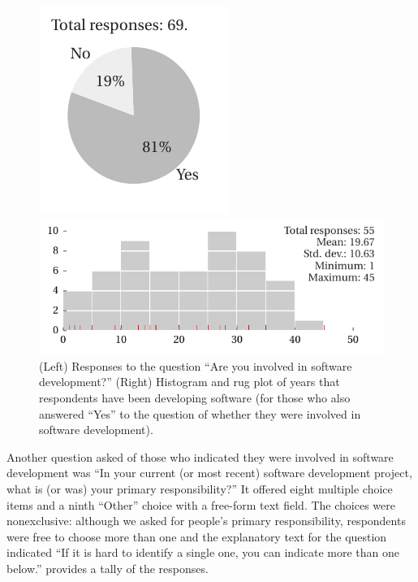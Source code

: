 \documentclass{casicswhitepaper}
\begin{document}
\begin{figure}[thb]
  \vspace*{1ex}
  \hspace*{0.25in}
  \begin{minipage}[b]{0.3\linewidth}
    \includegraphics{files/plots/number-of-developers.pdf}
  \end{minipage}%
  \begin{minipage}[b]{0.75\linewidth}
    \includegraphics{files/plots/histogram-years.pdf}
  \end{minipage}%
  \vspace*{-2ex}
  \caption{(Left) Responses to the question  ``Are you involved in software development?'' (Right) Histogram and rug plot of years that respondents have been developing software (for those who also answered ``Yes'' to the question of whether they were involved in software development).}
  \label{years}
\end{figure}

Another question asked of those who indicated they were involved in software development was ``In your current (or most recent) software development project, what is (or was) your primary responsibility?'' It offered eight multiple choice items and a ninth ``Other'' choice with a free-form text field.  The choices were nonexclusive: although we asked for people's primary responsibility, respondents were free to choose more than one and the explanatory text for the question indicated ``If it is hard to identify a single one, you can indicate more than one below.''   provides a tally of the responses.
\end{document}

